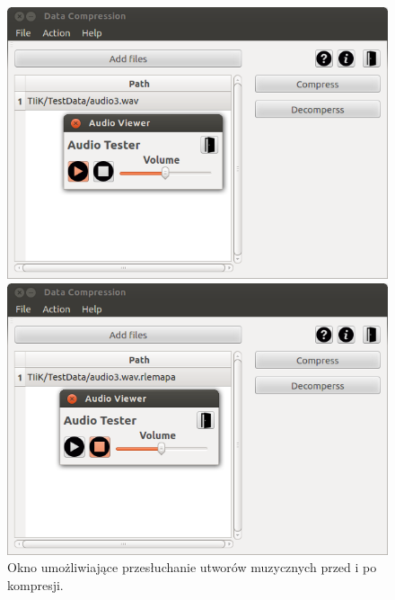 \documentclass[12pt,a4paper,notitlepage]{report}
\begin{document}
\begin{figure}[H]
	\centering
	\begin{minipage}{0.45\textwidth}
		\centering
		\includegraphics[scale=.4]{audioviewer_clean}
	\end{minipage}\hfill
	\begin{minipage}{0.45\textwidth}
		\centering
		\includegraphics[scale=.4]{audioviewer_com}
	\end{minipage}
	\caption{Okno umożliwiające przesłuchanie utworów muzycznych przed i po kompresji.}
\end{figure}
\end{document}
